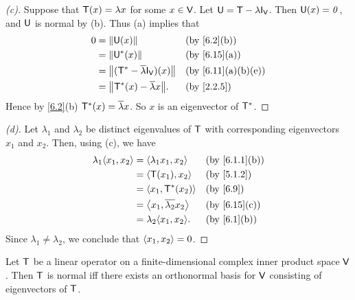 \begin{proof}[(c)]
  Suppose that \(\mathsf{T}(x) = \lambda x\) for some \(x \in \mathsf{V}\).
  Let \(\U = \T - \lambda \IT[\V]\).
  Then \(\mathsf{U}(x) = \mathit{0}\), and \(\mathsf{U}\) is normal by (b).
  Thus (a) implies that
  \begin{align*}
    0 & = \norm{\U(x)}                              &  & \text{(by \cref{6.2}(b))}        \\
      & = \norm{\U^*(x)}                            &  & \text{(by \cref{6.15}(a))}       \\
      & = \norm{(\T^* - \conj{\lambda} \IT[\V])(x)} &  & \text{(by \cref{6.11}(a)(b)(e))} \\
      & = \norm{\T^*(x) - \conj{\lambda} x}.        &  & \text{(by \cref{2.2.5})}
  \end{align*}
  Hence by \cref{6.2}(b) \(\mathsf{T}^*(x) = \overline{\lambda} x\).
  So \(x\) is an eigenvector of \(\mathsf{T}^*\).
\end{proof}

\begin{proof}[(d)]
  Let \(\lambda_1\) and \(\lambda_2\) be distinct eigenvalues of \(\mathsf{T}\) with corresponding eigenvectors \(x_1\) and \(x_2\).
  Then, using (c), we have
  \begin{align*}
    \lambda_1 \inn{x_1, x_2} & = \inn{\lambda_1 x_1, x_2}        &  & \text{(by \cref{6.1.1}(b))} \\
                             & = \inn{\T(x_1), x_2}              &  & \text{(by \cref{5.1.2})}    \\
                             & = \inn{x_1, \T^*(x_2)}            &  & \text{(by \cref{6.9})}      \\
                             & = \inn{x_1, \conj{\lambda_2} x_2} &  & \text{(by \cref{6.15}(c))}  \\
                             & = \lambda_2 \inn{x_1, x_2}.       &  & \text{(by \cref{6.1}(b))}
  \end{align*}
  Since \(\lambda_1 \neq \lambda_2\), we conclude that \(\left\langle x_1, x_2\right\rangle = 0\).
\end{proof}

\begin{thm}\label{6.16}
  Let \(\mathsf{T}\) be a linear operator on a finite-dimensional complex inner product space \(\mathsf{V}\).
  Then \(\mathsf{T}\) is normal iff there exists an orthonormal basis for \(\mathsf{V}\) consisting of eigenvectors of \(\mathsf{T}\).
\end{thm}

